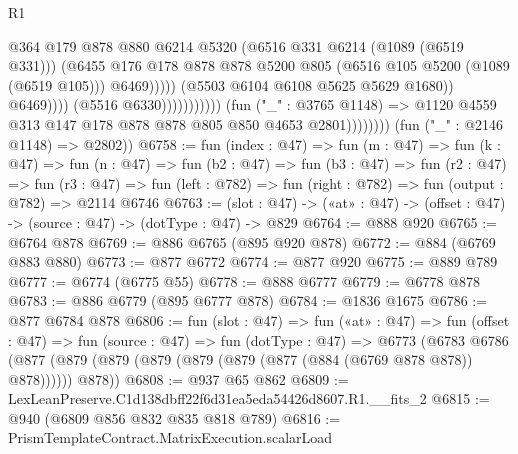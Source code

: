 \begin{lexlean}{R1}
\begin{coremodule}
                                                          @364
                                                          @179
                                                          @878
                                                          @880
                                                          @6214
                                                          @5320
                                                          (@6516 @331 @6214 (@1089 (@6519 @331)))
                                                          (@6455
                                                            @176
                                                            @178
                                                            @878
                                                            @878
                                                            @5200
                                                            @805
                                                            (@6516 @105 @5200 (@1089 (@6519 @105)))
                                                            @6469)))))
                                                  (@5503 @6104 @6108 @5625 @5629 @1680))
                                                @6469))))
                                        (@5516 @6330)))))))))))
                    (fun ("_" : @3765 @1148) =>
                    @1120 @4559 @313 @147 @178 @878 @878 @805 @850 @4653 @2801))))))))
      (fun ("_" : @2146 @1148) => @2802))
@6758 := fun (index : @47) =>
  fun (m : @47) =>
  fun (k : @47) =>
  fun (n : @47) =>
  fun (b2 : @47) =>
  fun (b3 : @47) =>
  fun (r2 : @47) =>
  fun (r3 : @47) => fun (left : @782) => fun (right : @782) => fun (output : @782) => @2114 @6746
@6763 := (slot : @47) -> («at» : @47) -> (offset : @47) -> (source : @47) -> (dotType : @47) -> @829
@6764 := @888 @920
@6765 := @6764 @878
@6769 := @886 @6765 (@895 @920 @878)
@6772 := @884 (@6769 @883 @880)
@6773 := @877 @6772
@6774 := @877 @920
@6775 := @889 @789
@6777 := @6774 (@6775 @55)
@6778 := @888 @6777
@6779 := @6778 @878
@6783 := @886 @6779 (@895 @6777 @878)
@6784 := @1836 @1675
@6786 := @877 @6784 @878
@6806 := fun (slot : @47) =>
  fun («at» : @47) =>
  fun (offset : @47) =>
  fun (source : @47) =>
  fun (dotType : @47) =>
  @6773
    (@6783
      @6786
      (@877 (@879 (@879 (@879 (@879 (@879 (@877 (@884 (@6769 @878 @878)) @878)))))) @878))
@6808 := @937 @65 @862
@6809 := LexLeanPreserve.C1d138dbff22f6d31ea5eda54426d8607.R1.__fits_2
@6815 := @940 (@6809 @856 @832 @835 @818 @789)
@6816 := PrismTemplateContract.MatrixExecution.scalarLoad

\end{coremodule}
\end{lexlean}
